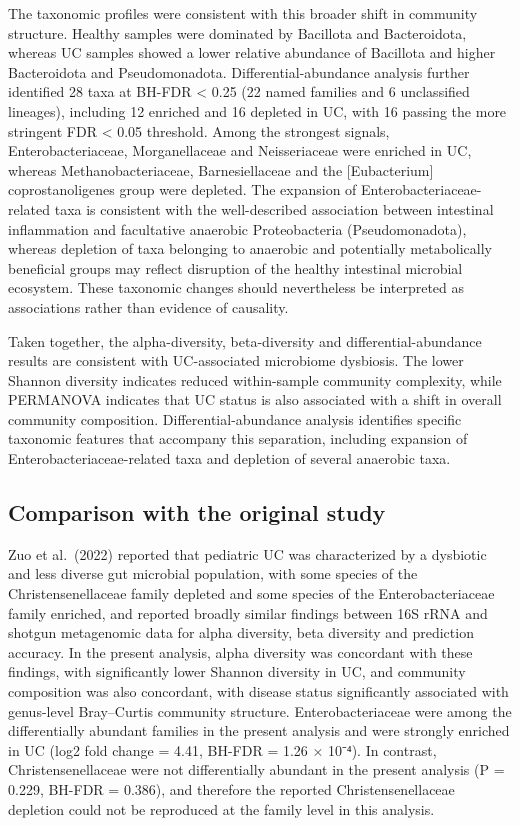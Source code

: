 \documentclass[
  letterpaper,
  DIV=11,
  numbers=noendperiod]{scrartcl}
\begin{document}
The taxonomic profiles were consistent with this broader shift in
community structure. Healthy samples were dominated by Bacillota and
Bacteroidota, whereas UC samples showed a lower relative abundance of
Bacillota and higher Bacteroidota and Pseudomonadota.
Differential-abundance analysis further identified 28 taxa at BH-FDR
\textless{} 0.25 (22 named families and 6 unclassified lineages),
including 12 enriched and 16 depleted in UC, with 16 passing the more
stringent FDR \textless{} 0.05 threshold. Among the strongest signals,
Enterobacteriaceae, Morganellaceae and Neisseriaceae were enriched in
UC, whereas Methanobacteriaceae, Barnesiellaceae and the
{[}Eubacterium{]} coprostanoligenes group were depleted. The expansion
of Enterobacteriaceae-related taxa is consistent with the well-described
association between intestinal inflammation and facultative anaerobic
Proteobacteria (Pseudomonadota), whereas depletion of taxa belonging to
anaerobic and potentially metabolically beneficial groups may reflect
disruption of the healthy intestinal microbial ecosystem. These
taxonomic changes should nevertheless be interpreted as associations
rather than evidence of causality.

Taken together, the alpha-diversity, beta-diversity and
differential-abundance results are consistent with UC-associated
microbiome dysbiosis. The lower Shannon diversity indicates reduced
within-sample community complexity, while PERMANOVA indicates that UC
status is also associated with a shift in overall community composition.
Differential-abundance analysis identifies specific taxonomic features
that accompany this separation, including expansion of
Enterobacteriaceae-related taxa and depletion of several anaerobic taxa.

\subsection{Comparison with the original
study}\label{comparison-with-the-original-study}

Zuo et al.~(2022) reported that pediatric UC was characterized by a
dysbiotic and less diverse gut microbial population, with some species
of the Christensenellaceae family depleted and some species of the
Enterobacteriaceae family enriched, and reported broadly similar
findings between 16S rRNA and shotgun metagenomic data for alpha
diversity, beta diversity and prediction accuracy. In the present
analysis, alpha diversity was concordant with these findings, with
significantly lower Shannon diversity in UC, and community composition
was also concordant, with disease status significantly associated with
genus-level Bray--Curtis community structure. Enterobacteriaceae were
among the differentially abundant families in the present analysis and
were strongly enriched in UC (log2 fold change = 4.41, BH-FDR = 1.26 ×
10⁻⁴). In contrast, Christensenellaceae were not differentially abundant
in the present analysis (P = 0.229, BH-FDR = 0.386), and therefore the
reported Christensenellaceae depletion could not be reproduced at the
family level in this analysis.
\end{document}
